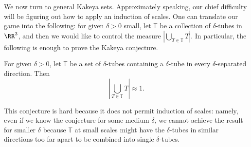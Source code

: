 \documentclass{article}
\begin{document}
We now turn to general Kakeya sets. Approximately speaking, our chief difficulty will be figuring out how to apply an induction of scales. One can translate our game into the following: for given $\delta>0$ small, let $\mathbb T$ be a collection of $\delta$-tubes in $\RR^3$, and then we would like to control the measure $\left|\bigcup_{T\in\mathbb T}T\right|$. In particular, the following is enough to prove the Kakeya conjecture.
\begin{conj} \label{conj:kakeya-conj-discrete}
	For given $\delta>0$, let $\mathbb T$ be a set of $\delta$-tubes containing a $\delta$-tube in every $\delta$-separated direction. Then
	\[\left|\bigcup_{T\in\mathbb T}T\right|\approx1.\]
\end{conj}
This conjecture is hard because it does not permit induction of scales: namely, even if we know the conjecture for some medium $\delta$, we cannot achieve the result for smaller $\delta$ because $\mathbb T$ at small scales might have the $\delta$-tubes in similar directions too far apart to be combined into single $\delta$-tubes.
\end{document}
